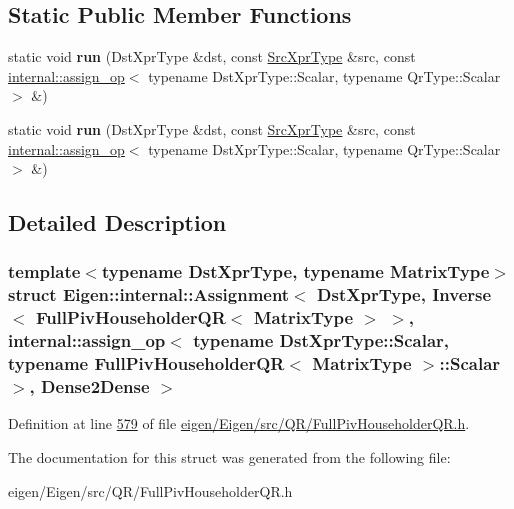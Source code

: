 \subsection*{Static Public Member Functions}
\begin{DoxyCompactItemize}
\item 
\mbox{\label{struct_eigen_1_1internal_1_1_assignment_3_01_dst_xpr_type_00_01_inverse_3_01_full_piv_householde4c13323440da58b97e1a51d313048bfd_a65c6aaebd0c9c0ae0b79b8b104a60cdc}} 
static void {\bfseries run} (Dst\+Xpr\+Type \&dst, const \hyperlink{class_eigen_1_1_inverse}{Src\+Xpr\+Type} \&src, const \hyperlink{struct_eigen_1_1internal_1_1assign__op}{internal\+::assign\+\_\+op}$<$ typename Dst\+Xpr\+Type\+::\+Scalar, typename Qr\+Type\+::\+Scalar $>$ \&)
\item 
\mbox{\label{struct_eigen_1_1internal_1_1_assignment_3_01_dst_xpr_type_00_01_inverse_3_01_full_piv_householde4c13323440da58b97e1a51d313048bfd_a65c6aaebd0c9c0ae0b79b8b104a60cdc}} 
static void {\bfseries run} (Dst\+Xpr\+Type \&dst, const \hyperlink{class_eigen_1_1_inverse}{Src\+Xpr\+Type} \&src, const \hyperlink{struct_eigen_1_1internal_1_1assign__op}{internal\+::assign\+\_\+op}$<$ typename Dst\+Xpr\+Type\+::\+Scalar, typename Qr\+Type\+::\+Scalar $>$ \&)
\end{DoxyCompactItemize}


\subsection{Detailed Description}
\subsubsection*{template$<$typename Dst\+Xpr\+Type, typename Matrix\+Type$>$\newline
struct Eigen\+::internal\+::\+Assignment$<$ Dst\+Xpr\+Type, Inverse$<$ Full\+Piv\+Householder\+Q\+R$<$ Matrix\+Type $>$ $>$, internal\+::assign\+\_\+op$<$ typename Dst\+Xpr\+Type\+::\+Scalar, typename Full\+Piv\+Householder\+Q\+R$<$ Matrix\+Type $>$\+::\+Scalar $>$, Dense2\+Dense $>$}



Definition at line \hyperlink{eigen_2_eigen_2src_2_q_r_2_full_piv_householder_q_r_8h_source_l00579}{579} of file \hyperlink{eigen_2_eigen_2src_2_q_r_2_full_piv_householder_q_r_8h_source}{eigen/\+Eigen/src/\+Q\+R/\+Full\+Piv\+Householder\+Q\+R.\+h}.



The documentation for this struct was generated from the following file\+:\begin{DoxyCompactItemize}
\item 
eigen/\+Eigen/src/\+Q\+R/\+Full\+Piv\+Householder\+Q\+R.\+h\end{DoxyCompactItemize}
